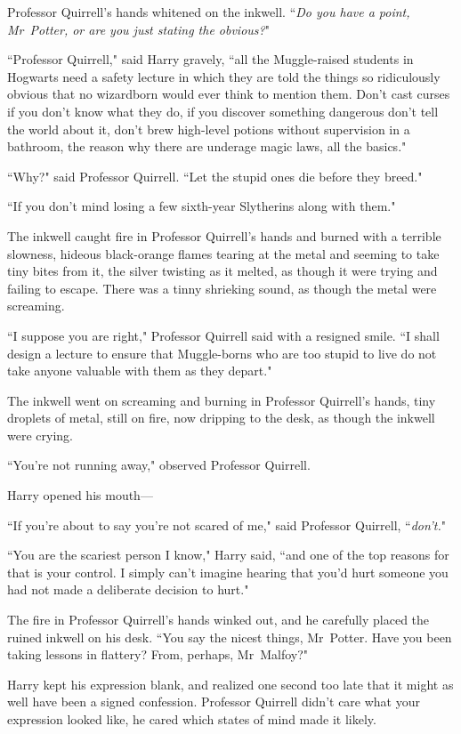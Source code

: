Professor Quirrell's hands whitened on the inkwell. ``\emph{Do you have a point, Mr~Potter, or are you just stating the obvious?}"

``Professor Quirrell," said Harry gravely, ``all the Muggle-raised students in Hogwarts need a safety lecture in which they are told the things so ridiculously obvious that no wizardborn would ever think to mention them. Don't cast curses if you don't know what they do, if you discover something dangerous don't tell the world about it, don't brew high-level potions without supervision in a bathroom, the reason why there are underage magic laws, all the basics."

``Why?" said Professor Quirrell. ``Let the stupid ones die before they breed."

``If you don't mind losing a few sixth-year Slytherins along with them."

The inkwell caught fire in Professor Quirrell's hands and burned with a terrible slowness, hideous black-orange flames tearing at the metal and seeming to take tiny bites from it, the silver twisting as it melted, as though it were trying and failing to escape. There was a tinny shrieking sound, as though the metal were screaming.

``I suppose you are right," Professor Quirrell said with a resigned smile. ``I shall design a lecture to ensure that Muggle-borns who are too stupid to live do not take anyone valuable with them as they depart."

The inkwell went on screaming and burning in Professor Quirrell's hands, tiny droplets of metal, still on fire, now dripping to the desk, as though the inkwell were crying.

``You're not running away," observed Professor Quirrell.

Harry opened his mouth—

``If you're about to say you're not scared of me," said Professor Quirrell, ``\emph{don't.}"

``You are the scariest person I know," Harry said, ``and one of the top reasons for that is your control. I simply can't imagine hearing that you'd hurt someone you had not made a deliberate decision to hurt."

The fire in Professor Quirrell's hands winked out, and he carefully placed the ruined inkwell on his desk. ``You say the nicest things, Mr~Potter. Have you been taking lessons in flattery? From, perhaps, Mr~Malfoy?"

Harry kept his expression blank, and realized one second too late that it might as well have been a signed confession. Professor Quirrell didn't care what your expression looked like, he cared which states of mind made it likely.

